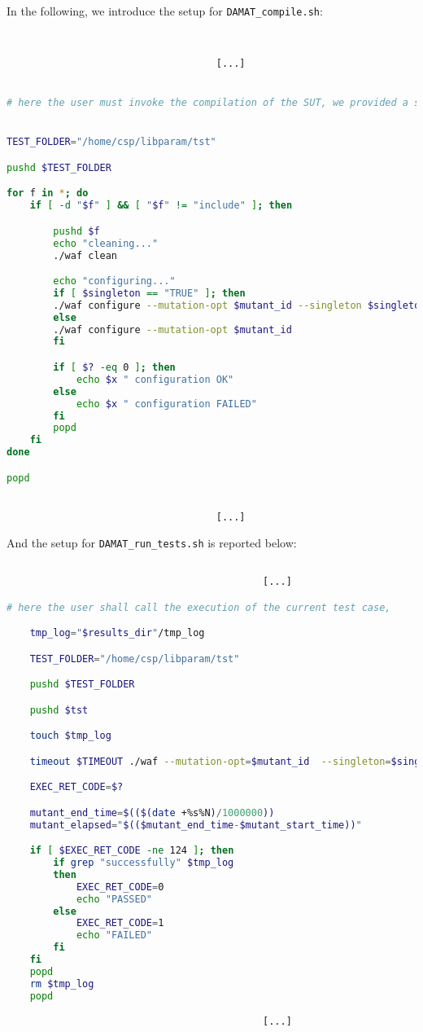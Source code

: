 In the following, we introduce the setup for \texttt{DAMAT\_compile.sh}:

\begin{lstlisting}[language=bash]


									[...]


# here the user must invoke the compilation of the SUT, we provided a simple example.


TEST_FOLDER="/home/csp/libparam/tst"

pushd $TEST_FOLDER

for f in *; do
    if [ -d "$f" ] && [ "$f" != "include" ]; then

        pushd $f
        echo "cleaning..."
        ./waf clean

        echo "configuring..."
        if [ $singleton == "TRUE" ]; then
        ./waf configure --mutation-opt $mutant_id --singleton $singleton
        else
        ./waf configure --mutation-opt $mutant_id
        fi

        if [ $? -eq 0 ]; then
            echo $x " configuration OK"
        else
            echo $x " configuration FAILED"
        fi
        popd
    fi
done

popd


									[...]


\end{lstlisting}

And the setup for \texttt{DAMAT\_run\_tests.sh} is reported below:

\begin{lstlisting}[language=bash]

											[...]

# here the user shall call the execution of the current test case,

    tmp_log="$results_dir"/tmp_log

    TEST_FOLDER="/home/csp/libparam/tst"

    pushd $TEST_FOLDER

    pushd $tst

    touch $tmp_log

    timeout $TIMEOUT ./waf --mutation-opt=$mutant_id  --singleton=$singleton 2>&1 | tee $tmp_log

    EXEC_RET_CODE=$?

    mutant_end_time=$(($(date +%s%N)/1000000))
    mutant_elapsed="$(($mutant_end_time-$mutant_start_time))"

    if [ $EXEC_RET_CODE -ne 124 ]; then
        if grep "successfully" $tmp_log
        then
            EXEC_RET_CODE=0
            echo "PASSED"
        else
            EXEC_RET_CODE=1
            echo "FAILED"
        fi
    fi
    popd
    rm $tmp_log
    popd

											[...]

\end{lstlisting}

